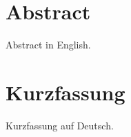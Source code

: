 
{%
\chapter*{Abstract}

Abstract in English.
}

{%
\chapter*{Kurzfassung}

Kurzfassung auf Deutsch.
}